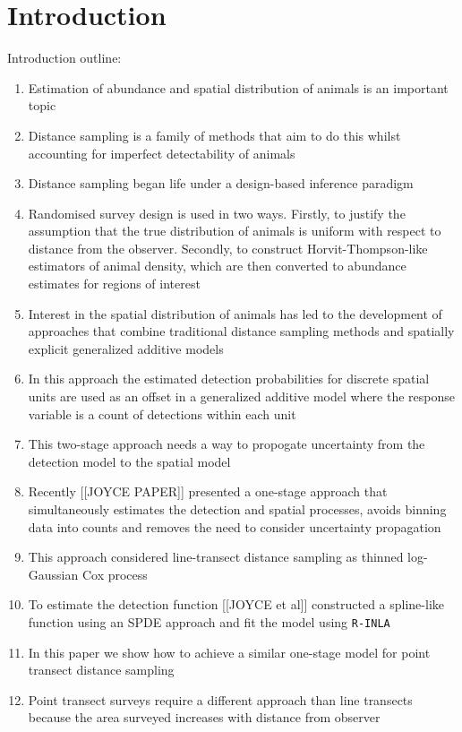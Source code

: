 \documentclass[preprint,12pt]{elsarticle}
\begin{document}
\section*{Introduction}

Introduction outline:
\begin{enumerate}
	\item Estimation of abundance and spatial distribution of animals is an important topic
	\item Distance sampling is a family of methods that aim to do this whilst accounting for imperfect detectability of animals
	\item Distance sampling began life under a design-based inference paradigm
	\item Randomised survey design is used in two ways.  Firstly, to justify the assumption that the true distribution of animals is uniform with respect to distance from the observer.  Secondly, to construct Horvit-Thompson-like estimators of animal density, which are then converted to abundance estimates for regions of interest
	\item Interest in the spatial distribution of animals has led to the development of approaches that combine traditional distance sampling methods and spatially explicit generalized additive models
	\item In this approach the estimated detection probabilities for discrete spatial units are used as an offset in a generalized additive model where the response variable is a count of detections within each unit
	\item This two-stage approach needs a way to propogate uncertainty from the detection model to the spatial model
	\item Recently [[JOYCE PAPER]] presented a one-stage approach that simultaneously estimates the detection and spatial processes, avoids binning data into counts and removes the need to consider uncertainty propagation
	\item This approach considered line-transect distance sampling as thinned log-Gaussian Cox process
	\item To estimate the detection function [[JOYCE et al]] constructed a spline-like function using an SPDE approach and fit the model using \texttt{R-INLA}
	\item In this paper we show how to achieve a similar one-stage model for point transect distance sampling
	\item Point transect surveys require a different approach than line transects because the area surveyed increases with distance from observer

\end{enumerate}
\end{document}
